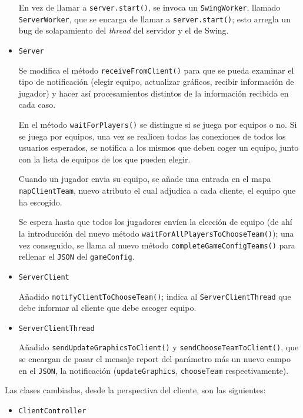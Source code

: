 \documentclass[../DocumentoOficial.tex]{subfiles}
\begin{document}
\begin{sprint}[6]
\begin{itemize}
En vez de llamar a \texttt{server.start()}, se invoca un \texttt{SwingWorker}, llamado \texttt{ServerWorker}, que se encarga de llamar a \texttt{server.start()}; esto arregla un bug de solapamiento del \textit{thread} del servidor y el de Swing.

\item \texttt{Server}

Se modifica el método \texttt{receiveFromClient()} para que se pueda examinar el tipo de notificación (elegir equipo, actualizar gráficos, recibir información de jugador) y hacer así procesamientos distintos de la información recibida en cada caso.

En el método \texttt{waitForPlayers()} se distingue si se juega por equipos o no. Si se juega por equipos, una vez se realicen todas las conexiones de todos los usuarios esperados, se notifica a los mismos que deben coger un equipo, junto con la lista de equipos de los que pueden elegir.

Cuando un jugador envia su equipo, se añade una entrada en el mapa \texttt{mapClientTeam}, nuevo atributo el cual adjudica a cada cliente, el equipo que ha escogido.

Se espera hasta que todos los jugadores envíen la elección de equipo (de ahí la introducción del nuevo método \texttt{waitForAllPlayersToChooseTeam()}); una vez conseguido, se llama al nuevo método \texttt{completeGameConfigTeams()} para rellenar el \texttt{JSON} del \texttt{gameConfig}.

\item \texttt{ServerClient}

Añadido \texttt{notifyClientToChooseTeam()}; indica al \texttt{ServerClientThread} que debe informar al cliente que debe escoger equipo.

\item \texttt{ServerClientThread}

Añadido \texttt{sendUpdateGraphicsToClient()} y \texttt{sendChooseTeamToClient()}, que se encargan de pasar el mensaje report del parámetro más un nuevo campo en el \texttt{JSON}, la notificación (\texttt{updateGraphics}, \texttt{chooseTeam} respectivamente).

\end{itemize}

Las clases cambiadas, desde la perspectiva del cliente, son las siguientes:

\begin{itemize}

\item \texttt{ClientController}


\end{itemize}
\end{sprint}
\end{document}
